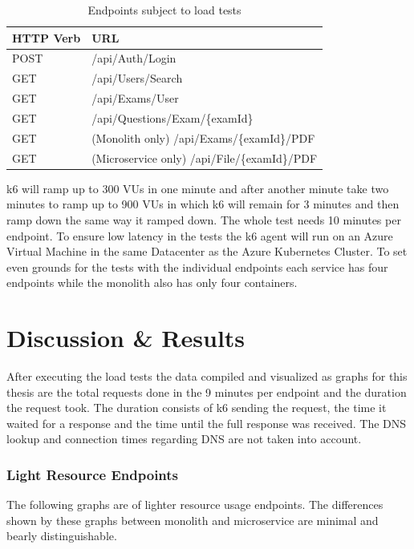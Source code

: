 \documentclass[BIF,Bachelor,nenglish]{twbook}%
\begin{document}
\begin{table}[!ht]
    \centering
    \begin{tabular}{|l|l|}
    \hline
        \ac{HTTP} Verb & URL \\ \hline
        POST & /api/Auth/Login \\ \hline
        GET & /api/Users/Search \\ \hline
        GET & /api/Exams/User \\ \hline
        GET & /api/Questions/Exam/\{examId\} \\ \hline
        GET & (Monolith only) /api/Exams/\{examId\}/PDF \\ \hline
        GET & (Microservice only) /api/File/\{examId\}/PDF \\ \hline
    \end{tabular}
 \caption{Endpoints subject to load tests}
 \label{loadTestEndpoints}
\end{table}

\noindent
k6 will ramp up to 300 \ac{VU}s in one minute and after another minute take two minutes to ramp up to 900 \ac{VU}s in which k6 will remain for 3 minutes and then ramp down the same way it ramped down. The whole test needs 10 minutes per endpoint. To ensure low latency in the tests the k6 agent will run on an Azure Virtual Machine in the same Datacenter as the Azure Kubernetes Cluster. To set even grounds for the tests with the individual endpoints each service has four endpoints while the monolith also has only four containers.

\chapter{Discussion \& Results}
After executing the load tests the data compiled and visualized as graphs for this thesis are the total requests done in the 9 minutes per endpoint and the duration the request took. The duration consists of k6 sending the request, the time it waited for a response and the time until the full response was received. The DNS lookup and connection times regarding DNS are not taken into account.

\subsection{Light Resource Endpoints}
The following graphs are of lighter resource usage endpoints. The differences shown by these graphs between monolith and microservice are minimal and bearly distinguishable.
\end{document}
